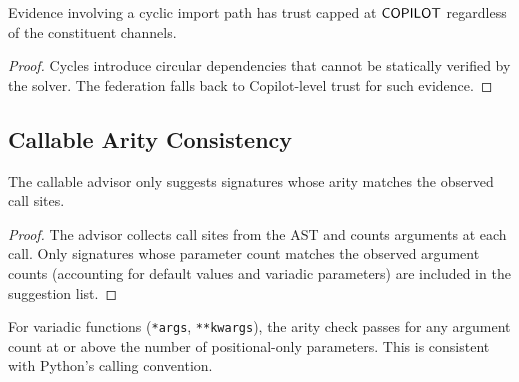 \documentclass[11pt]{article}
\begin{document}
\begin{lemma}%
\label{lem:cycletrust}
Evidence involving a cyclic import path has trust capped at
$\mathsf{COPILOT}$ regardless of the constituent channels.
\end{lemma}
\begin{proof}
Cycles introduce circular dependencies that cannot be
statically verified by the solver.  The federation falls
back to Copilot-level trust for such evidence.
\end{proof}

\subsection{Callable Arity Consistency}

\begin{lemma}%
\label{lem:arityconsist}
The callable advisor only suggests signatures whose arity
matches the observed call sites.
\end{lemma}
\begin{proof}
The advisor collects call sites from the AST and counts
arguments at each call.  Only signatures whose parameter
count matches the observed argument counts (accounting for
default values and variadic parameters) are included in the
suggestion list.
\end{proof}

\begin{remark}
For variadic functions (\texttt{*args}, \texttt{**kwargs}),
the arity check passes for any argument count at or above
the number of positional-only parameters.  This is consistent
with Python's calling convention.
\end{remark}
\end{document}
